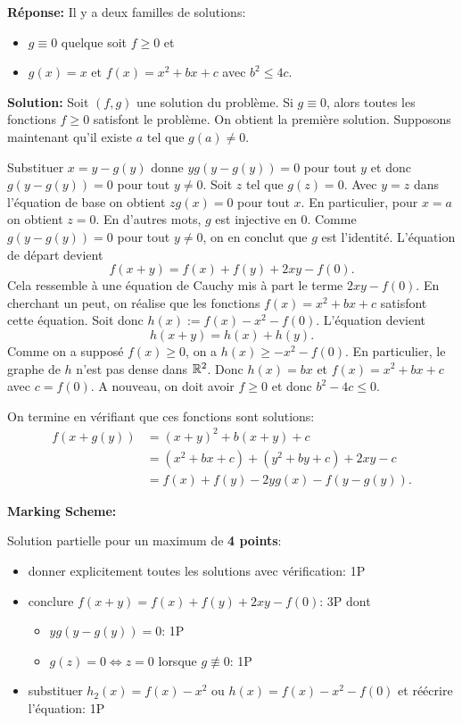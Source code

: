 \documentclass[language=german,style=solution]{smo}
\begin{document}
\begin{enumerate}
\textbf{Réponse:} Il y a deux familles de solutions:
\begin{itemize}
\item $g\equiv 0$ quelque soit $f\geq 0$ et
\item $g(x)=x$ et $f(x)=x^2+bx+c$ avec $b^2\leq 4c$.
\end{itemize}

\textbf{Solution:}
Soit $(f,g)$ une solution du problème. Si $g\equiv 0$, alors toutes les fonctions $f\geq 0$ satisfont le problème. On obtient la première solution. Supposons maintenant qu'il existe $a$ tel que $g(a)\neq 0$.

Substituer $x=y-g(y)$ donne $yg(y-g(y))=0$ pour tout $y$ et donc $g(y-g(y))=0$ pour tout $y\neq 0$. Soit $z$ tel que $g(z)=0$. Avec $y=z$ dans l'équation de base on obtient $zg(x)=0$ pour tout $x$. En particulier, pour $x=a$ on obtient $z=0$. En d'autres mots, $g$ est injective en $0$. Comme $g(y-g(y))=0$ pour tout $y\neq 0$, on en conclut que $g$ est l'identité. L'équation de départ devient
\[
f(x+y)=f(x)+f(y)+2xy-f(0).
\]
Cela ressemble à une équation de Cauchy mis à part le terme $2xy-f(0)$. En cherchant un peut, on réalise que les fonctions $f(x)=x^2+bx+c$ satisfont cette équation. Soit donc $h(x):=f(x)-x^2-f(0)$. L'équation devient
\[
h(x+y)=h(x)+h(y).
\]
Comme on a supposé $f(x)\geq 0$, on a $h(x)\geq -x^2-f(0)$. En particulier, le graphe de $h$ n'est pas dense dans $\mathbb{R}^2$. Donc $h(x)=bx$ et $f(x)=x^2+bx+c$ avec $c=f(0)$. A nouveau, on doit avoir $f\geq 0$ et donc $b^2-4c\leq 0$.

On termine en vérifiant que ces fonctions sont solutions:
\begin{align*}
f(x+g(y))&=(x+y)^2+b(x+y)+c\\
&=(x^2+bx+c)+(y^2+by+c)+2xy-c\\
&=f(x)+f(y)-2yg(x)-f(y-g(y)).
\end{align*}

\textbf{Marking Scheme:}

Solution partielle pour un maximum de \textbf{4 points}:
\begin{itemize}
\item donner explicitement toutes les solutions avec vérification: 1P

\item conclure $f(x+y)=f(x)+f(y)+2xy-f(0)$: 3P dont
\begin{itemize}
\item $yg(y-g(y))=0$: 1P
\item $g(z)=0\Leftrightarrow z=0$ lorsque $g\not\equiv 0$: 1P
\end{itemize}
\item substituer $h_2(x)=f(x)-x^2$ ou $h(x)=f(x)-x^2-f(0)$ et réécrire l'équation: 1P
\end{itemize}


\end{enumerate}
\end{document}

